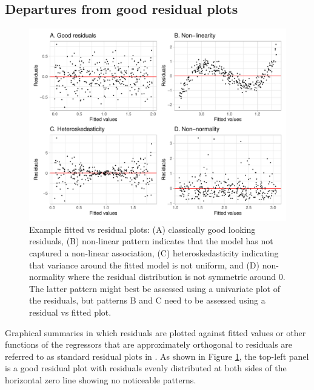 \documentclass[]{interact}
\theoremstyle{plain}%
\theoremstyle{definition}
\theoremstyle{remark}
\begin{document}
\hypertarget{departures-from-good-residual-plots}{%
\subsection{Departures from good residual
plots}\label{departures-from-good-residual-plots}}

\begin{figure}

{\centering \includegraphics[width=1\linewidth]{paper_comparison_files/figure-latex/residual-plot-common-departures-1} 

}

\caption{Example fitted vs residual plots: (A) classically good looking residuals, (B) non-linear pattern indicates that the model has not captured a non-linear association, (C) heteroskedasticity indicating that variance around the fitted model is not uniform, and (D) non-normality where the residual distribution is not symmetric around 0. The latter pattern might best be assessed using a univariate plot of the residuals, but patterns B and C need to be assessed using a residual vs fitted plot.}\label{fig:residual-plot-common-departures}
\end{figure}

Graphical summaries in which residuals are plotted against fitted values
or other functions of the regressors that are approximately orthogonal
to residuals are referred to as standard residual plots in
\citet{cook1982residuals}. As shown in Figure
\ref{fig:residual-plot-common-departures}, the top-left panel is a good
residual plot with residuals evenly distributed at both sides of the
horizontal zero line showing no noticeable patterns.
\end{document}
